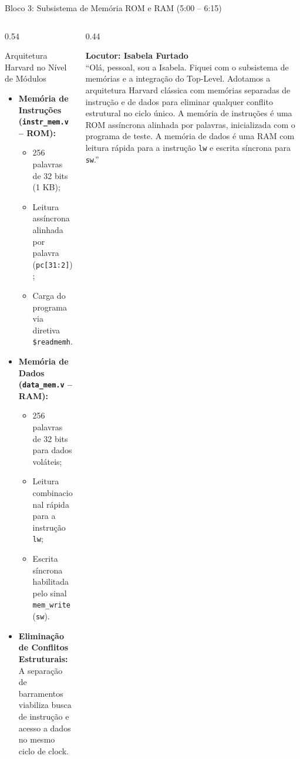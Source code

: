 \documentclass[aspectratio=169, 10pt]{beamer}
\begin{document}
\begin{frame}{Bloco 3: Subsistema de Memória ROM e RAM (5:00 -- 6:15)}
  \begin{columns}[T]
    \begin{column}{0.54\textwidth}
      \begin{block}{Arquitetura Harvard no Nível de Módulos}
        \footnotesize
        \begin{itemize}\setlength{\itemsep}{1pt}
          \item \textbf{Memória de Instruções (\texttt{instr\_mem.v} -- ROM):}
            \begin{itemize}
              \item 256 palavras de 32 bits (1 KB);
              \item Leitura assíncrona alinhada por palavra (\texttt{pc[31:2]});
              \item Carga do programa via diretiva \texttt{\$readmemh}.
            \end{itemize}
          \item \textbf{Memória de Dados (\texttt{data\_mem.v} -- RAM):}
            \begin{itemize}
              \item 256 palavras de 32 bits para dados voláteis;
              \item Leitura combinacional rápida para a instrução \texttt{lw};
              \item Escrita síncrona habilitada pelo sinal \texttt{mem\_write} (\texttt{sw}).
            \end{itemize}
          \item \textbf{Eliminação de Conflitos Estruturais:}
            A separação de barramentos viabiliza busca de instrução e acesso a dados no mesmo ciclo de clock.
        \end{itemize}
      \end{block}
    \end{column}

    \begin{column}{0.44\textwidth}
      \begin{tcolorbox}[speakerbox]
        \textbf{Locutor: Isabela Furtado}\\
        \vspace{1mm}
        \scriptsize
        ``Olá, pessoal, sou a Isabela. Fiquei com o subsistema de memórias e a integração do Top-Level.
        Adotamos a arquitetura Harvard clássica com memórias separadas de instrução e de dados para eliminar qualquer conflito estrutural no ciclo único.
        A memória de instruções é uma ROM assíncrona alinhada por palavras, inicializada com o programa de teste.
        A memória de dados é uma RAM com leitura rápida para a instrução \texttt{lw} e escrita síncrona para \texttt{sw}.''
      \end{tcolorbox}
    \end{column}
  \end{columns}
\end{frame}
\end{document}

